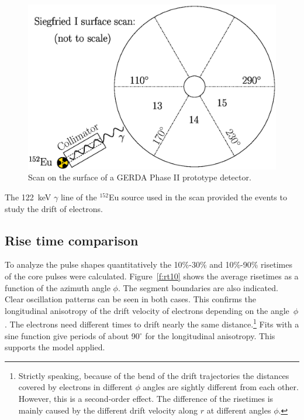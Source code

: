 \documentclass[epj]{svjour}
\begin{document}
\begin{figure}[htbp]
\centering
\includegraphics[width=0.8\linewidth]{siscan}
\caption{Scan on the surface of a GERDA Phase II prototype detector.}
\label{f:siscan}
\end{figure}

The 122~keV $\gamma$ line of the $^{152}$Eu source used in the scan
provided the events to study the drift of electrons. 

\subsection{Rise time comparison}
\label{s:lon}
To analyze the pulse shapes quantitatively the 10\%-30\% and 10\%-90\%
risetimes of the core pulses were calculated. Figure~\ref{f:rt10}
shows the average risetimes as a function of the azimuth angle
$\phi$. The segment boundaries are also indicated.  Clear oscillation
patterns can be seen in both cases. This confirms the longitudinal
anisotropy of the drift velocity of electrons depending on the
angle~$\phi$. The electrons need different times to drift nearly the
same distance.\footnote{Strictly speaking, because of the bend of the
drift trajectories the distances covered by electrons in different
$\phi$ angles are sightly different from each other.  However, this is
a second-order effect. The difference of the risetimes is mainly
caused by the different drift velocity along $r$ at different angles
$\phi$.} Fits with a sine function give periods of about 90$^{\circ}$
for the longitudinal anisotropy. This supports the model applied.
\end{document}
